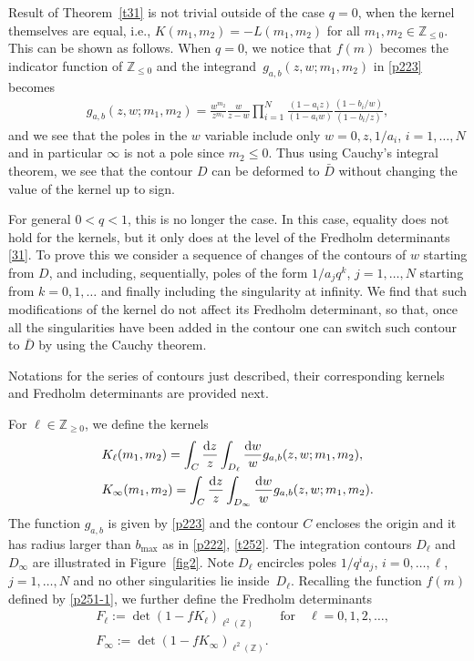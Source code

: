 \documentclass[pdftex]{sigma}
\numberwithin{equation}{section}
\def\i{\infty}
\def\Z{\mathbb{Z}}
\begin{document}
Result of Theorem~\ref{t31} is not trivial outside of the case $q=0$, when the kernel themselves are equal, i.e., $K(m_1,m_2)=-L(m_1,m_2)$ for all $m_1,m_2\in\Z_{\le 0}$. This can be shown as follows. When $q=0$, we notice that $f(m)$ becomes the indicator function of $\mathbb{Z}_{\le 0}$ and the integrand~${g_{a,b}(z,w;m_1,m_2)}$ in \eqref{p223} becomes
\begin{align*}
 g_{a,b}(z,w;m_1,m_2)
 =\frac{w^{m_2}}{z^{m_1}}
\frac{w}{z-w}
\prod_{i=1}^N
\frac{(1-a_i z)}{(1-a_iw)}
\frac{(1-b_i/w)}{(1-b_i/z)},
\end{align*}
and we see that the poles in the $w$ variable include only $w=0, z, 1/a_i$, $i=1,\dots,N$ and in particular $\infty$ is not a pole since $m_2 \le 0$. Thus using Cauchy's integral theorem, we see that the contour $D$ can be deformed to $\bar{D}$ without changing the value of the kernel up to sign.

For general $0<q<1$, this is no longer the case. In this case, equality does not hold for the kernels, but it only does at the level of the Fredholm determinants \eqref{31}. To prove this we consider a sequence of changes of the contours of $w$ starting from $D$, and including, sequentially, poles of the form $1/a_j q^k$, $j=1,\dots,N$ starting from $k=0,1,\dots$ and finally including the singularity at infinity. We find that such modifications of the kernel do not affect its Fredholm determinant, so that, once all the singularities have been added in the contour one can switch such contour to $\bar{D}$ by using the Cauchy theorem.


Notations for the series of contours just described, their corresponding kernels and Fredholm determinants are provided next.
\begin{Definition}\label{d31}
For $\ell\in\mathbb{Z}_{\ge 0}$, we define the kernels
\begin{align}
\label{d31-3}
&K_\ell (m_1,m_2)=
\int_C\frac{{\rm d}z}{z}\int_{D_\ell}\frac{{\rm d}w}{w} g_{a,b}(z,w;m_1,m_2),
\\
\label{d31-4}
&K_{\i}(m_1,m_2)
=
\int_C\frac{{\rm d}z}{z}\int_{D_{\i}}\frac{{\rm d}w}{w} g_{a,b}(z,w;m_1,m_2).
\end{align}
The function $g_{a,b}$ is given by \eqref{p223} and the contour $C$ encloses the origin and it has radius larger than $b_{\max}$ as in \eqref{p222}, \eqref{t252}. The integration contours $D_\ell$ and $D_{\infty}$ are illustrated in Figure~\ref{fig2}.
Note $D_\ell$ encircles poles $1/q^{i}a_j$, $i=0,\dots,\ell$, $j=1,\dots,N$ and no other singularities lie inside~$D_{\ell}$.
Recalling the function $f(m)$ defined by \eqref{p251-1}, we further define the Fredholm determinants
\begin{align}
\label{d31-1}
&F_\ell:=\det(1-fK_\ell)_{\ell^2(\Z)}\qquad \text{for}\quad \ell=0,1,2,\dots,
\\
\label{d31-2}
&F_{\infty}:=\det(1-f K_{\i})_{\ell^2(\Z)}.
\end{align}
\end{Definition}
\end{document}
